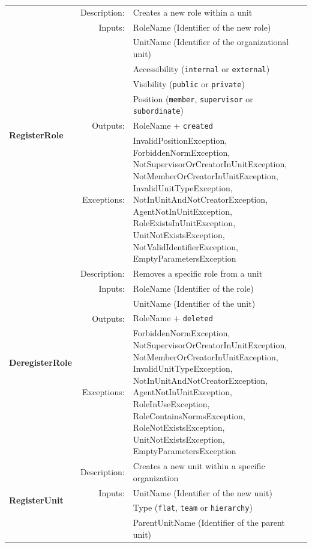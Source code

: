 \begin{longtable}{|p{3cm}|r|p{8.5cm}|}
  \hline
  \multirow{8}{*}{\textbf{RegisterRole}} & Description: & Creates a new role within a unit \\ \cline{2-3}
    & Inputs: & RoleName (Identifier of the new role) \\ \cline{3-3}
    &  & UnitName (Identifier of the organizational unit) \\ \cline{3-3} 
    &  & Accessibility (\texttt{internal} or \texttt{external}) \\ \cline{3-3} 
    &  & Visibility (\texttt{public} or \texttt{private}) \\ \cline{3-3} 
    &  & Position (\texttt{member}, \texttt{supervisor} or \texttt{subordinate}) \\ \cline{2-3}
    & Outputs:     & RoleName + \texttt{created} \\ \cline{2-3}
    & Exceptions:  & InvalidPositionException, ForbiddenNormException, NotSupervisorOrCreatorInUnitException, NotMemberOrCreatorInUnitException, InvalidUnitTypeException, NotInUnitAndNotCreatorException, AgentNotInUnitException, RoleExistsInUnitException, UnitNotExistsException, NotValidIdentifierException, EmptyParametersException \\ \hline
  \hline
  \multirow{5}{*}{\textbf{DeregisterRole}} & Description: & Removes a specific role from a unit \\ \cline{2-3}
    & Inputs: & RoleName (Identifier of the role) \\ \cline{3-3}
    &  & UnitName (Identifier of the unit) \\ \cline{2-3}
    & Outputs:     & RoleName + \texttt{deleted} \\ \cline{2-3}
    & Exceptions:  & ForbiddenNormException, NotSupervisorOrCreatorInUnitException, NotMemberOrCreatorInUnitException, InvalidUnitTypeException, NotInUnitAndNotCreatorException, AgentNotInUnitException, RoleInUseException, RoleContainsNormsException, RoleNotExistsException, UnitNotExistsException, EmptyParametersException \\ \hline
  \hline
  \multirow{7}{*}{\textbf{RegisterUnit}} & Description: & Creates a new unit within a specific organization \\ \cline{2-3}
    & Inputs: & UnitName (Identifier of the new unit) \\ \cline{3-3}
    &  & Type (\texttt{flat}, \texttt{team} or \texttt{hierarchy}) \\ \cline{3-3}
    &  & ParentUnitName (Identifier of the parent unit) \\ \cline{3-3}

\end{longtable}
